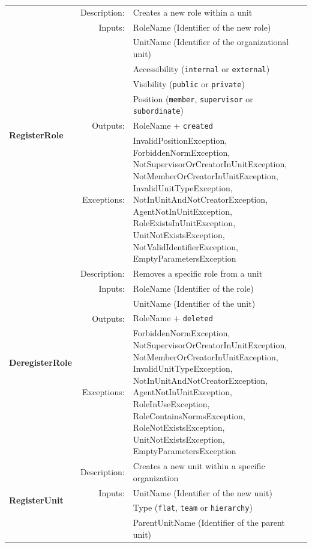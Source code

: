 \begin{longtable}{|p{3cm}|r|p{8.5cm}|}
  \hline
  \multirow{8}{*}{\textbf{RegisterRole}} & Description: & Creates a new role within a unit \\ \cline{2-3}
    & Inputs: & RoleName (Identifier of the new role) \\ \cline{3-3}
    &  & UnitName (Identifier of the organizational unit) \\ \cline{3-3} 
    &  & Accessibility (\texttt{internal} or \texttt{external}) \\ \cline{3-3} 
    &  & Visibility (\texttt{public} or \texttt{private}) \\ \cline{3-3} 
    &  & Position (\texttt{member}, \texttt{supervisor} or \texttt{subordinate}) \\ \cline{2-3}
    & Outputs:     & RoleName + \texttt{created} \\ \cline{2-3}
    & Exceptions:  & InvalidPositionException, ForbiddenNormException, NotSupervisorOrCreatorInUnitException, NotMemberOrCreatorInUnitException, InvalidUnitTypeException, NotInUnitAndNotCreatorException, AgentNotInUnitException, RoleExistsInUnitException, UnitNotExistsException, NotValidIdentifierException, EmptyParametersException \\ \hline
  \hline
  \multirow{5}{*}{\textbf{DeregisterRole}} & Description: & Removes a specific role from a unit \\ \cline{2-3}
    & Inputs: & RoleName (Identifier of the role) \\ \cline{3-3}
    &  & UnitName (Identifier of the unit) \\ \cline{2-3}
    & Outputs:     & RoleName + \texttt{deleted} \\ \cline{2-3}
    & Exceptions:  & ForbiddenNormException, NotSupervisorOrCreatorInUnitException, NotMemberOrCreatorInUnitException, InvalidUnitTypeException, NotInUnitAndNotCreatorException, AgentNotInUnitException, RoleInUseException, RoleContainsNormsException, RoleNotExistsException, UnitNotExistsException, EmptyParametersException \\ \hline
  \hline
  \multirow{7}{*}{\textbf{RegisterUnit}} & Description: & Creates a new unit within a specific organization \\ \cline{2-3}
    & Inputs: & UnitName (Identifier of the new unit) \\ \cline{3-3}
    &  & Type (\texttt{flat}, \texttt{team} or \texttt{hierarchy}) \\ \cline{3-3}
    &  & ParentUnitName (Identifier of the parent unit) \\ \cline{3-3}

\end{longtable}
